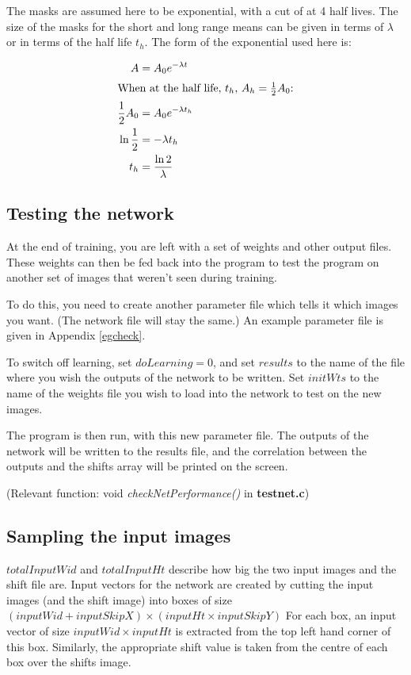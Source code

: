 \documentclass[a4paper]{article}
\begin{document}
The masks are assumed here to be exponential, with a cut of at 4 half
lives.  The size of the masks for the short and long range means can
be given in terms of $\lambda$ or in terms of the half life $t_h$. The
form of the exponential used here is:

\begin{align*}
  A & = A_0 e ^{- \lambda t} \\ 
  \intertext{When at the half life, $t_h$, $A_h = \frac{1}{2}A_0$:}
  \frac{1}{2}A_0 & = A_0 e ^{-\lambda t_h} \\
  \ln \frac{1}{2}& = - \lambda t_h \\
  t_h & =  \frac{\ln 2}{\lambda}
\end{align*}

\subsection{Testing the network}

At the end of training, you are left with a set of weights and other
output files.  These weights can then be fed back into the program to
test the program on another set of images that weren't seen during
training.

To do this, you need to create another parameter file which tells it
which images you want.  (The network file will stay the same.)  An
example parameter file is given in Appendix \ref{egcheck}.

To switch off learning, set $doLearning=0$, and set $results$ to the
name of the file where you wish the outputs of the network to be
written. Set $initWts$ to the name of the weights file you wish to
load into the network to test on the new images.

The program is then run, with this new parameter file.  The outputs of
the network will be written to the results file, and the correlation
between the outputs and the shifts array will be printed on the
screen.

(Relevant function:   void {\em checkNetPerformance()} in {\bf testnet.c})

\subsection{Sampling the input images}

$totalInputWid$ and $totalInputHt$ describe how big the two input
images and the shift file are.  Input vectors for the network are
created by cutting the input images (and the shift image) into boxes
of size $(inputWid + inputSkipX) \times (inputHt \times inputSkipY) $
For each box, an input vector of size $inputWid \times inputHt$ is
extracted from the top left hand corner of this box.  Similarly, the
appropriate shift value is taken from the centre of each box over the
shifts image.
\end{document}
